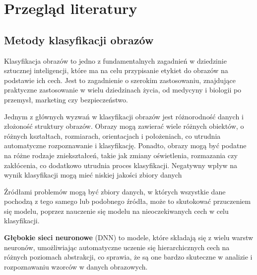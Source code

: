
\chapter*{Przegląd literatury}
\section*{Metody klasyfikacji obrazów}

Klasyfikacja obrazów to jedno z fundamentalnych zagadnień w dziedzinie sztucznej inteligencji, które ma na celu przypisanie etykiet do obrazów na podstawie ich cech.
Jest to zagadnienie o szerokim zastosowaniu, znajdujące praktyczne zastosowanie w wielu dziedzinach życia, od medycyny i biologii po przemysł, marketing czy bezpieczeństwo.

Jednym z głównych wyzwań w klasyfikacji obrazów jest różnorodność danych i złożoność struktury obrazów.
Obrazy mogą zawierać wiele różnych obiektów, o różnych kształtach, rozmiarach, orientacjach i położeniach, co utrudnia automatyczne rozpoznawanie i klasyfikację.
Ponadto, obrazy mogą być podatne na różne rodzaje zniekształceń, takie jak zmiany oświetlenia, rozmazania czy zakłócenia, co dodatkowo utrudnia proces klasyfikacji.
Negatywny wpływ na wynik klasyfikacji mogą mieć niskiej jakości zbiory danych

Źródłami  problemów mogą być zbiory danych, w których wszystkie dane pochodzą z tego samego lub podobnego źródła, może to skutokować przuczeniem się modelu, poprzez nauczenie się modelu na nieoczekiwanych cech w celu klasyfikacji.

\textbf{Głębokie sieci neuronowe} (DNN) to modele, które składają się z wielu warstw neuronów, umożliwiając automatyczne uczenie się hierarchicznych cech na różnych poziomach abstrakcji, co sprawia, że są one bardzo skuteczne w analizie i rozpoznawaniu wzorców w danych obrazowych.

